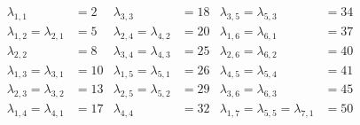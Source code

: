 \begin{align*}
\lambda_{1,1} &= 2 & \lambda_{3,3} &= 18 & \lambda_{3,5} = \lambda_{5,3} &= 34\\
\lambda_{1,2} = \lambda_{2,1} &= 5 & \lambda_{2,4} = \lambda_{4,2} &= 20 & \lambda_{1,6} = \lambda_{6,1} &= 37\\
\lambda_{2,2} &= 8 & \lambda_{3,4} = \lambda_{4,3} &= 25 & \lambda_{2,6} = \lambda_{6,2} &= 40\\
\lambda_{1,3} = \lambda_{3,1} &= 10 & \lambda_{1,5} = \lambda_{5,1} &= 26 & \lambda_{4,5} = \lambda_{5,4} &= 41\\
\lambda_{2,3} = \lambda_{3,2} &= 13 & \lambda_{2,5} = \lambda_{5,2} &= 29 & \lambda_{3,6} = \lambda_{6,3} &= 45\\
\lambda_{1,4} = \lambda_{4,1} &= 17 & \lambda_{4,4} &= 32 & \lambda_{1,7} = \lambda_{5,5} = \lambda_{7,1} &= 50
\end{align*}%
